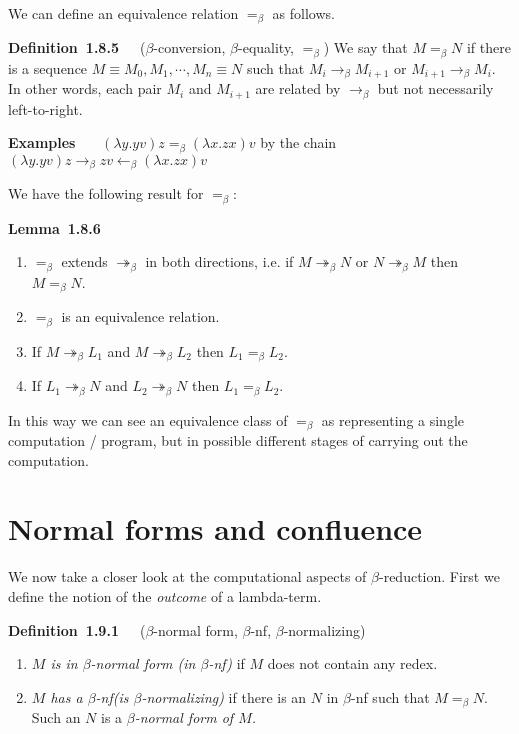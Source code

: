 \documentclass[letterpaper]{article}
\newenvironment{lemma}[2][]{\par\medskip
	\noindent \textbf{Lemma~#2}~~~#1 \rmfamily\em}{\medskip}
\newenvironment{examplesNonNum}[1][]{\par\medskip
	\noindent \textbf{Examples}~~~#1 \rmfamily}{\medskip}
\newenvironment{definition}[2][]{\par\medskip
	\noindent \textbf{Definition~#2}~~~#1 \rmfamily}{\medskip}
\renewcommand{\l}{\lambda}
\newcommand{\beq}{=_\beta}
\newcommand{\bnf}{$\beta$-nf\xspace}
\newcommand{\betaro}{\rightarrow_\beta}
\newcommand{\betar}{\twoheadrightarrow_\beta}
\begin{document}
We can define an equivalence relation $\beq$ as follows.

\begin{definition}[($\beta$-conversion, $\beta$-equality, $\beq$)]{1.8.5}
	We say that $M \beq N$ if there is a sequence $M \equiv M_0, M_1, \cdots, M_n \equiv N$ such that $M_i \betaro M_{i+1}$ or $M_{i+1} \betaro M_i$. In other words, each pair $M_i$ and $M_{i+1}$ are related by $\betaro$ but not necessarily left-to-right.
\end{definition}

\begin{examplesNonNum}
	$(\l y . y v)z \beq (\l x . zx )v$ by the chain $(\l y. y v)z \betaro z v \leftarrow_\beta (\l x . z x)v$
\end{examplesNonNum}

We have the following result for $\beq$:

\begin{lemma}{1.8.6}
	\begin{enumerate}
		\item $\beq$ extends $\betar$ in both directions, i.e. if $M \betar N$ or $N \betar M$ then $M \beq N$.
		\item $\beq$ is an equivalence relation.
		\item If $M \betar L_1$ and $M \betar L_2$ then $L_1 \beq L_2$.
		\item If $L_1 \betar N$ and $L_2 \betar N$ then $L_1 \beq L_2$.
	\end{enumerate}
\end{lemma}
In this way we can see an equivalence class of $\beq$ as representing a single computation / program, but in possible different stages of carrying out the computation.

\section{Normal forms and confluence}

We now take a closer look at the computational aspects of $\beta$-reduction. First we define the notion of the \emph{outcome} of a lambda-term.
\begin{definition}[($\beta$-normal form, \bnf, $\beta$-normalizing)]{1.9.1}
	\begin{enumerate}
		\item \emph{$M$ is in $\beta$-normal form (in \bnf)} if $M$ does not contain any redex.
		\item \emph{$M$ has a \bnf (is $\beta$-normalizing)} if there is an $N$ in \bnf such that $M \beq N$. Such an $N$ is a \emph{$\beta$-normal form of $M$.}
	\end{enumerate}
\end{definition}
\end{document}

